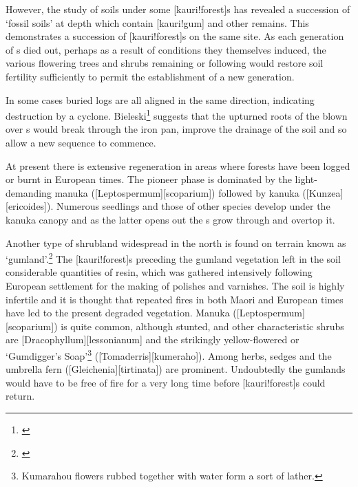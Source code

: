 However, the study of soils under some [kauri!forest]s has revealed a succession of `fossil soils' at depth which contain [kauri!gum] and other remains.
This demonstrates a succession of [kauri!forest]s on the same site.
As each generation of s died out, perhaps as a result of conditions they themselves induced, the various flowering trees and shrubs remaining or following would restore soil fertility sufficiently to permit the establishment of a new  generation.

In some cases buried  logs are all aligned in the same direction, indicating destruction by a cyclone.
Bieleski\footnote{\cite{bieleski1959factors}} suggests that the upturned roots of the blown over s would break through the iron pan, improve the drainage of the soil and so allow a new sequence to commence.

At present there is extensive  regeneration in areas where forests have been logged or burnt in European times.
The pioneer phase is dominated by the light-demanding manuka ([Leptospermum][scoparium]) followed by kanuka ([Kunzea][ericoides]).
Numerous  seedlings and those of other species develop under the kanuka canopy and as the latter opens out the s grow through and overtop it.

Another type of shrubland widespread in the north is found on terrain known as `gumland'.\footnote{\cite{esler1975gumland}}
The [kauri!forest]s preceding the gumland vegetation left in the soil considerable quantities of resin, which was gathered intensively following European settlement for the making of polishes and varnishes.
The soil is highly infertile and it is thought that repeated fires in both Maori and European times have led to the present degraded vegetation.
Manuka ([Leptospermum][scoparium]) is quite common, although stunted, and other characteristic shrubs are [Dracophyllum][lessonianum] and the strikingly yellow-flowered  or `Gumdigger's Soap'\footnote{Kumarahou flowers rubbed together with water form a sort of lather.} ([Tomaderris][kumeraho]).
Among herbs, sedges and the umbrella fern ([Gleichenia][tirtinata]) are prominent.
Undoubtedly the gumlands would have to be free of fire for a very long time before [kauri!forest]s could return.

